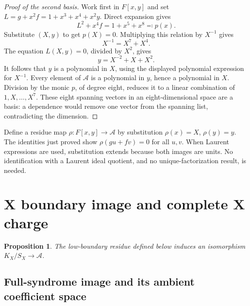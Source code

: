 \documentclass{article}
\newtheorem{proposition}{Proposition}
\begin{document}
\begin{proof}[Proof of the second basis]
  Work first in \(F[x,y]\) and set
  \(L=g+x^2f=1+x^3+x^4+x^2y\). Direct expansion gives
  \begin{equation}
    L^2+x^4f=1+x^5+x^8\eqqcolon p(x).
  \end{equation}
  Substitute \((X,y)\) to get \(p(X)=0\). Multiplying this relation by
  \(X^{-1}\) gives
  \begin{equation}
    X^{-1}=X^7+X^4.
  \end{equation}
  The equation \(L(X,y)=0\), divided by \(X^2\), gives
  \begin{equation}
    y=X^{-2}+X+X^2.
  \end{equation}
  It follows that \(y\) is a polynomial in \(X\), using the displayed polynomial
  expression for \(X^{-1}\). Every element of \(\mathcal{A}\) is a polynomial in
  \(y\), hence a polynomial in \(X\). Division by the monic \(p\), of degree
  eight, reduces it to a linear combination of \(1,X,\dots,X^7\).
  These eight spanning vectors in an eight-dimensional space are a basis:
  a dependence would remove one vector from the spanning list, contradicting
  the dimension.
\end{proof}

Define a residue map \(\rho\colon F[x,y]\to\mathcal{A}\) by substitution
\(\rho(x)=X\), \(\rho(y)=y\). The identities just proved show
\(\rho(gu+fv)=0\) for all \(u,v\). When Laurent expressions are used,
substitution extends because both images are units. No identification with a
Laurent ideal quotient, and no unique-factorization result, is needed.

\section{X boundary image and complete X charge}\label{sec:x-charge}

\begin{proposition}\label{prop:x-charge}
  The low-boundary residue defined below induces an isomorphism
  \(K_X/S_X\to\mathcal{A}\).
\end{proposition}

\subsection{Full-syndrome image and its ambient coefficient space}\label{sec:x-image}
\end{document}
